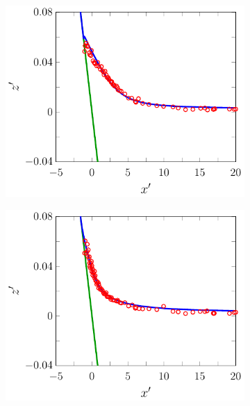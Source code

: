 \begin{figure}
	\begin{subfigure}{0.5\textwidth}
		\includegraphics[width=\textwidth]{./chp6/figures/Experiment/Synolakis/H0p0185/FEVM/50s.pdf}
		\vspace{0.5cm}
	\end{subfigure}%
	\begin{subfigure}{0.5\textwidth}
		\includegraphics[width=\textwidth]{./chp6/figures/Experiment/Synolakis/H0p0185/FEVM/60s.pdf}
		\vspace{0.5cm}
			\end{subfigure}
	\begin{subfigure}{0.5\textwidth}

\end{subfigure}
\end{figure}
